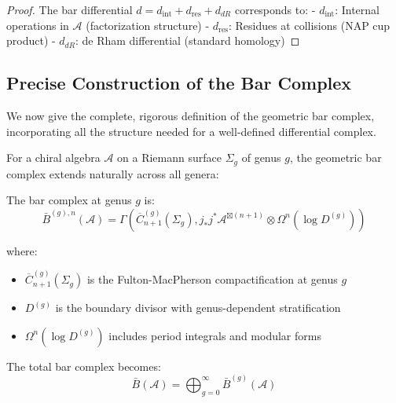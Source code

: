 \begin{proof}
The bar differential $d = d_{\text{int}} + d_{\text{res}} + d_{dR}$ corresponds to:
- $d_{\text{int}}$: Internal operations in $\mathcal{A}$ (factorization structure)
- $d_{\text{res}}$: Residues at collisions (NAP cup product)
- $d_{dR}$: de Rham differential (standard homology)
\end{proof}

\subsection{Precise Construction of the Bar Complex}

We now give the complete, rigorous definition of the geometric bar complex, incorporating all the structure needed for a well-defined differential complex.

For a chiral algebra $\mathcal{A}$ on a Riemann surface $\Sigma_g$ of genus $g$, the geometric bar complex extends naturally across all genera:

\begin{definition}
The bar complex at genus $g$ is:
$$\bar{B}^{(g),n}(\mathcal{A}) = \Gamma\left(\overline{C}_{n+1}^{(g)}(\Sigma_g), j_*j^*\mathcal{A}^{\boxtimes(n+1)} \otimes \Omega^n(\log D^{(g)})\right)$$

where:
\begin{itemize}
\item $\overline{C}_{n+1}^{(g)}(\Sigma_g)$ is the Fulton-MacPherson compactification at genus $g$
\item $D^{(g)}$ is the boundary divisor with genus-dependent stratification
\item $\Omega^n(\log D^{(g)})$ includes period integrals and modular forms
\end{itemize}

The total bar complex becomes:
$$\bar{B}(\mathcal{A}) = \bigoplus_{g=0}^{\infty} \bar{B}^{(g)}(\mathcal{A})$$
\end{definition}

